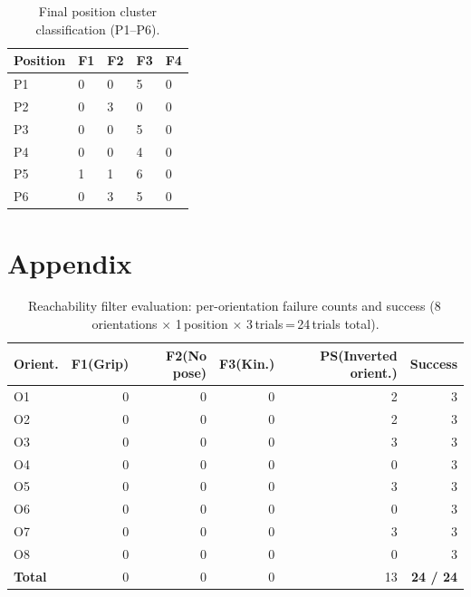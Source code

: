 \documentclass[12pt,a4paper]{report}
\begin{document}
\begin{table}[htbp]
  \centering
  \caption{Final position cluster classification (P1--P6).}
  \label{tab:final-position-clusters}
  \begin{tabular}{lllll}
    \toprule
    Position & F1 & F2 & F3 & F4 \\
    \midrule
    P1 & 0 & 0 & 5 & 0 \\
    P2 & 0 & 3 & 0 & 0 \\
    P3 & 0 & 0 & 5 & 0 \\
    P4 & 0 & 0 & 4 & 0 \\
    P5 & 1 & 1 & 6 & 0 \\
    P6 & 0 & 3 & 5 & 0 \\
    \bottomrule
  \end{tabular}
\end{table}

\newpage
\renewcommand{\thefigure}{A.\arabic{figure}}
\renewcommand{\thetable}{A.\arabic{table}}
\chapter*{Appendix}
\thispagestyle{empty}
\quad \addtocounter{page}{-1}
\begin{table}[htbp]
  \centering
  \caption{Reachability filter evaluation: per-orientation failure counts and success (8\,orientations $\times$ 1\,position $\times$ 3\,trials\,=\,24\,trials total).}
  \label{tab:appendix-results}
  \begin{tabular}{lrrrrr}
    \toprule
    Orient. & F1(Grip) & F2(No pose) & F3(Kin.) & PS(Inverted orient.) & Success \\
    \midrule
    O1 & 0 & 0 & 0 & 2 & 3 \\
    O2 & 0 & 0 & 0 & 2 & 3 \\
    O3 & 0 & 0 & 0 & 3 & 3 \\
    O4 & 0 & 0 & 0 & 0 & 3 \\
    O5 & 0 & 0 & 0 & 3 & 3 \\
    O6 & 0 & 0 & 0 & 0 & 3 \\
    O7 & 0 & 0 & 0 & 3 & 3 \\
    O8 & 0 & 0 & 0 & 0 & 3 \\
    \midrule
    \textbf{Total} & 0 & 0 & 0 & 13 & \textbf{24 / 24} \\
    \bottomrule
  \end{tabular}
\end{table}
\end{document}
